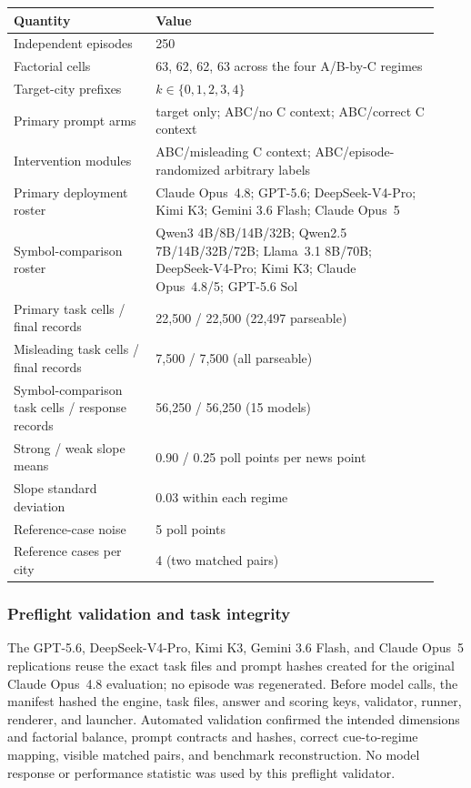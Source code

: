 \begin{center}
\begin{minipage}{\linewidth}
\centering
{}
\label{tab:coin-city-design}
\small
\begin{tabular}{p{0.31\linewidth} p{0.62\linewidth}}
\toprule
Quantity & Value \\
\midrule
Independent episodes & 250 \\
Factorial cells & 63, 62, 62, 63 across the four A/B-by-C regimes \\
Target-city prefixes & \(k\in\{0,1,2,3,4\}\) \\
Primary prompt arms & target only; ABC/no C context; ABC/correct C context \\
Intervention modules & ABC/misleading C context; ABC/episode-randomized arbitrary labels \\
Primary deployment roster & Claude Opus~4.8; GPT-5.6; DeepSeek-V4-Pro; Kimi K3; Gemini 3.6 Flash; Claude Opus~5 \\
Symbol-comparison roster & Qwen3 4B/8B/14B/32B; Qwen2.5 7B/14B/32B/72B;
Llama~3.1 8B/70B; DeepSeek-V4-Pro; Kimi K3; Claude Opus~4.8/5; GPT-5.6 Sol \\
Primary task cells / final records & 22,500 / 22,500 (22,497 parseable) \\
Misleading task cells / final records & 7,500 / 7,500 (all parseable) \\
Symbol-comparison task cells / response records & 56,250 / 56,250 (15 models) \\
Strong / weak slope means & 0.90 / 0.25 poll points per news point \\
Slope standard deviation & 0.03 within each regime \\
Reference-case noise & 5 poll points \\
Reference cases per city & 4 (two matched pairs) \\
\bottomrule
\end{tabular}
\end{minipage}
\end{center}

\subsubsection{Preflight validation and task integrity}
The GPT-5.6, DeepSeek-V4-Pro, Kimi K3, Gemini 3.6 Flash, and Claude Opus~5
replications reuse the exact task files and prompt hashes created for the original
Claude Opus~4.8 evaluation; no episode was regenerated. Before model calls, the
manifest hashed the engine, task files, answer and scoring keys, validator, runner,
renderer, and launcher. Automated validation confirmed the intended dimensions and
factorial balance, prompt contracts and hashes, correct cue-to-regime mapping,
visible matched pairs, and benchmark reconstruction. No model response or
performance statistic was used by this preflight validator.

